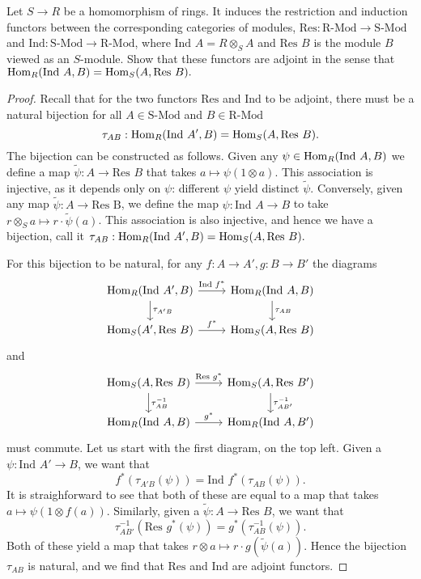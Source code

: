 \documentclass{../../mathnotes}
\begin{document}
\begin{prop}
    Let $S\to R$ be a homomorphism of rings. It induces the restriction and induction
    functors between the corresponding categories of modules, $\text{Res}:\text{R-Mod}\to\text{S-Mod}$
    and $\text{Ind}:\text{S-Mod}\to\text{R-Mod}$, where $\text{Ind }A=R\otimes_S A$ and $\text{Res }B$
    is the module $B$ viewed as an $S$-module. Show that these functors are adjoint in the
    sense that $\operatorname{Hom}_R(\text{Ind } A,B)=\operatorname{Hom}_S(A,\text{Res }B).$
\end{prop}
\begin{proof}
    Recall that for the two functors $\text{Res}$ and $\text{Ind}$ to be adjoint, there must be
    a natural bijection for all $A\in\text{S-Mod}$ and $B\in\text{R-Mod}$
    \[\tau_{AB}:\operatorname{Hom}_R(\text{Ind }A',B)=\operatorname{Hom}_S(A,\text{Res }B).\]
    The bijection can be constructed as follows. Given any $\psi\in\operatorname{Hom}_R(\text{Ind }A,B)$
    we define a map $\tilde\psi:A\to\text{Res }B$ that takes $a\mapsto \psi(1\otimes a)$. This association
    is injective, as it depends only on $\psi$: different $\psi$ yield distinct $\tilde\psi$. Conversely,
    given any map $\tilde\psi:A\to\text{Res B}$, we define the map $\psi:\text{Ind }A\to B$ to take
    $r\otimes_Sa\mapsto r\cdot\tilde\psi(a)$. This association is also injective, and hence we have a
    bijection, call it $\tau_{AB}:\operatorname{Hom}_R(\text{Ind }A',B)=\operatorname{Hom}_S(A,\text{Res }B).$ 

    For this bijection to be natural, for any $f:A\to A',g:B\to B'$ the diagrams
    \begin{equation*}
        \begin{tikzcd}
            \Hom_R(\text{Ind }A',B)\arrow{r}{\text{Ind }f^*}\arrow{d}{\tau_{A'B}}&\Hom_R(\text{Ind }A,B)\arrow{d}{\tau_{AB}}\\
            \Hom_S(A',\text{Res }B)\arrow{r}{f^*}&\Hom_S(A,\text{Res }B)
        \end{tikzcd}
    \end{equation*}
    and
    \begin{equation*}
        \begin{tikzcd}
            \Hom_S(A,\text{Res }B)\arrow{r}{\text{Res }g^*}\arrow{d}{\tau_{AB}^{-1}}&\Hom_S(A,\text{Res }B')\arrow{d}{\tau_{AB'}^{-1}}\\
            \Hom_R(\text{Ind }A,B)\arrow{r}{g^*}&\Hom_R(\text{Ind }A,B')
        \end{tikzcd}
    \end{equation*}
    must commute. Let us start with the first diagram, on the top left. Given a $\psi:\text{Ind }A'\to B$,
    we want that
    \[f^*(\tau_{A'B}(\psi))=\text{Ind }f^*(\tau_{AB}(\psi)).\]
    It is straighforward to see that both of these are equal to a map that takes $a\mapsto\psi(1\otimes f(a))$.
    Similarly, given a $\tilde\psi:A\to\text{Res }B$, we want that
    \[\tau^{-1}_{AB'}(\text{Res } g^*(\psi))=g^*(\tau^{-1}_{AB}(\psi)).\]
    Both of these yield a map that takes $r\otimes a\mapsto r\cdot g(\tilde\psi(a))$. Hence the bijection $\tau_{AB}$
    is natural, and we find that $\text{Res}$ and $\text{Ind}$ are adjoint functors.
\end{proof}
\end{document}
